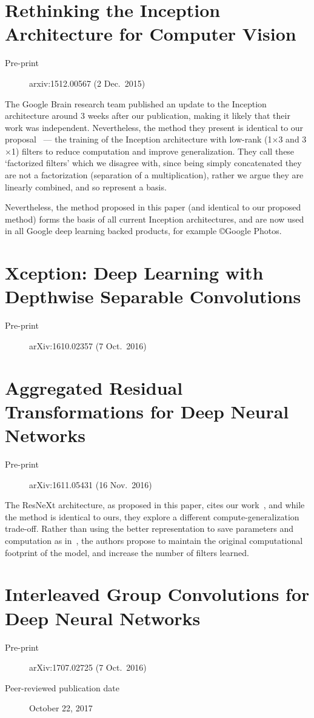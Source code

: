 \documentclass[thesis]{subfiles}
\begin{document}
\section{Rethinking the Inception Architecture for Computer Vision}
\begin{description}
    \item[Pre-print] arxiv:1512.00567 (2 Dec.\ 2015)
\end{description}
The Google Brain research team published an update to the Inception architecture around 3 weeks after our publication, making it likely that their work was independent. Nevertheless, the method they present is identical to our proposal~\citep{Ioannou2016} --- the training of the Inception architecture with low-rank (\ie{}1$\times$3 and 3$\times$1) filters to reduce computation and improve generalization. They call these `factorized filters' which we disagree with, since being simply concatenated they are not a factorization (\ie separation of a multiplication), rather we argue they are linearly combined, and so represent a basis.

Nevertheless, the method proposed in this paper (and identical to our proposed method) forms the basis of all current Inception architectures, and are now used in all Google deep learning backed products, for example \copyright{}Google Photos.

\section{Xception: Deep Learning with Depthwise Separable Convolutions}
\begin{description}
    \item[Pre-print] arXiv:1610.02357 (7 Oct.\ 2016)
\end{description}

\section{Aggregated Residual Transformations for Deep Neural Networks}
\begin{description}
    \item[Pre-print] arXiv:1611.05431 (16 Nov.\ 2016)
\end{description}
The ResNeXt architecture, as proposed in this paper, cites our work~\citep{ioannou2016e}, and while the method is identical to ours, they explore a different compute-generalization trade-off. Rather than using the better representation to save parameters and computation as in~\citep{ioannou2016e}, the authors propose to maintain the original computational footprint of the model, and increase the number of filters learned.

\section{Interleaved Group Convolutions for Deep Neural Networks}
\begin{description}
    \item[Pre-print] arXiv:1707.02725 (7 Oct.\ 2016)
    \item[Peer-reviewed publication date] October 22, 2017
\end{description}
\citet{zhang2017primal}
\end{document}
